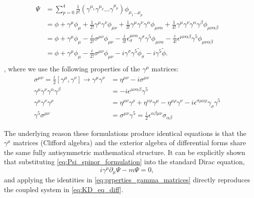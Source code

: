 \begin{equation}\label{eq:Psi_spinor_formulation}
\begin{aligned}
    \Psi&=\sum_{p=0}^{4}\frac{1}{p!}(\gamma^{\mu_1}\gamma^{\mu_2}\dots\gamma^{\mu_p})\phi_{\mu_1\dots\mu_p}\\
    &=\phi+\gamma^\mu\phi_\mu+\frac{1}{2!}\gamma^\mu\gamma^\nu\phi_{\mu\nu}+\frac{1}{3!}\gamma^\mu\gamma^\nu\gamma^\alpha\phi_{\mu\nu\alpha}+\frac{1}{4!}\gamma^\mu\gamma^\nu\gamma^\alpha\gamma^\beta\phi_{\mu\nu\alpha\beta}\\
    &=\phi+\gamma^\mu\phi_\mu-\frac{i}{2!}\sigma^{\mu\nu}\phi_{\mu\nu}-\frac{i}{3!}\epsilon_\sigma^{\mu\nu\alpha}\gamma^\sigma\gamma^5\phi_{\mu\nu\alpha}-\frac{i}{4!}\epsilon^{\mu\nu\alpha\beta}\gamma^5\phi_{\mu\nu\alpha\beta}\\
    &=\phi+\gamma^\mu\phi_\mu-\frac{i}{2!}\sigma^{\mu\nu}\phi_{\mu\nu}-i\gamma^\sigma\gamma^5\tilde\phi_\sigma-i\gamma^5\tilde\phi.\\
\end{aligned}
\end{equation}
, where we use the following properties of the $\gamma^\mu$ matrices:
\begin{equation}\label{eq:prperties_gamma_matrices}
\begin{aligned}
    \sigma^{\mu\nu}=\frac{i}{2}[\gamma^\mu,\gamma^\nu] \to \gamma^\mu\gamma^\nu&=\eta^{\mu\nu}-i\sigma^{\mu\nu}\\
    \gamma^\mu\gamma^\nu\gamma^\alpha\gamma^\beta&=-i\epsilon^{\mu\nu\alpha\beta}\gamma^5\\
    \gamma^\mu\gamma^\nu\gamma^\rho&=\eta^{\mu\nu}\gamma^\rho+\eta^{\nu\rho}\gamma^\mu-\eta^{\mu\rho}\gamma^\nu-i\epsilon^{\sigma\mu\nu\rho}\gamma_\sigma\gamma^5\\
    \gamma^5\sigma^{\mu\nu}&=\sigma^{\mu\nu}\gamma^5=\frac{i}{2}\epsilon^{\alpha\beta\mu\nu}\sigma_{\alpha\beta}
\end{aligned}
\end{equation}

The underlying reason these formulations produce identical equations is that the $\gamma^\mu$ matrices (Clifford algebra) and the exterior algebra of differential forms share the same fully antisymmetric mathematical structure. It can be explicitly shown that substituting \cref{eq:Psi_spinor_formulation} into the standard Dirac equation,
\begin{equation}
    i\gamma^\mu\partial_\mu \Psi-m\Psi=0,
\end{equation}
and applying the identities in \cref{eq:prperties_gamma_matrices} directly reproduces the coupled system in \cref{eq:KD_eq_diff}.

